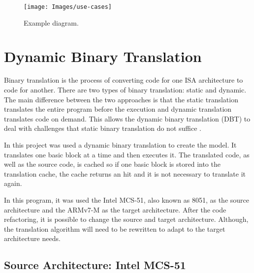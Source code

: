 \documentclass{report}
\begin{document}
			\begin{figure} [H]
				\centering
				\texttt{[image: Images/use-cases]}
				\caption{Example diagram.}
				\label{fig:use-cases}
			\end{figure}			
			

	\section{Dynamic Binary Translation}
	\par Binary translation is the process of converting code for one ISA architecture to code for another. There are two types of binary translation: static and dynamic. The main difference between the two approaches is that the static translation translates the entire program before the execution and dynamic translation translates code on demand. This allows the dynamic binary translation (DBT) to deal with challenges that static binary translation do not suffice \cite{b.hawkingsb.demskyd.brueningq.zhao2015}. 
	\par In this project was used a dynamic binary translation to create the model. It translates one basic block at a time and then executes it. The translated code, as well as the source code, is cached so if one basic block is stored into the translation cache, the cache returns an hit and it is not necessary to translate it again. 
	\par In this program, it was used the Intel MCS-51, also known as 8051, as the source architecture and the ARMv7-M as the target architecture. After the code refactoring, it is possible to change the source and target architecture. Although, the translation algorithm will need to be rewritten to adapt to the target architecture needs.
	
		\subsection{Source Architecture: Intel MCS-51}
		
\end{document}
